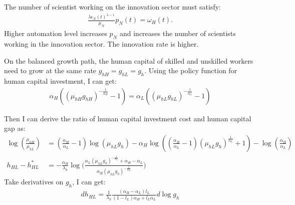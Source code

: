 \documentclass[12pt]{article}
\begin{document}
\begin{appendices}
The number of scientist working on the innovation sector must satisfy: 
\begin{align*}
 \frac{\lambda\epsilon_N(t)^{\lambda-1}}{\mu_N}p_N(t) = \omega_H(t).
\end{align*} 
Higher automation level increases $p_N$ and increases the number of scientists working in the innovation sector. The innovation rate is higher. 

On the balanced growth path, the human capital of skilled and unskilled workers need to grow at the same rate $g_{hH} = g_{hL} = g_h$. Using the policy function for human capital investment, I can get:
\begin{align*}
\alpha_H((\mu_{hH}g_{hH})^{-\frac{1}{\alpha_H}}-1) = \alpha_L((\mu_{hL}g_{hL})^{-\frac{1}{\alpha_L}}-1)
\end{align*}

Then I can derive the ratio of human capital investment cost and human capital gap as:
\begin{align*}
\log(\frac{\mu_{hH}}{\mu_{hL}}) &= (\frac{\alpha_H}{\alpha_L}-1)\log(\mu_{hL}g_h)-\alpha_H\log((\frac{\alpha_H}{\alpha_L}-1)(\mu_{hL}g_h)^{\frac{1}{\alpha_L}}+1)-\log(\frac{\alpha_H}{\alpha_L}) \\
h_{HL}-h_{HL}^*&= -\frac{\alpha_H}{\lambda_h}\log \Big(\frac{\alpha_L(\mu_{hL}g_h)^{-\frac{1}{\alpha_L}}+\alpha_H-\alpha_L}{\alpha_H(\mu_{hL}g_h)^{-\frac{1}{\alpha_H}}}\Big)
\end{align*}
Take derivatives on $g_h$, I can get:
\begin{align*}
dh_{HL} = \frac{1}{\lambda_h}\frac{(\alpha_H-\alpha_L)l_L}{(1-l_L)\alpha_H+l_L\alpha_L}d\log g_h
\end{align*}


\end{appendices}
\end{document}
